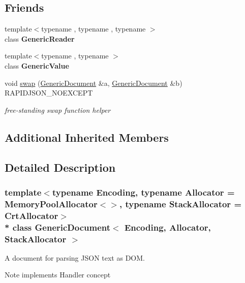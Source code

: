 \subsection*{Friends}
\begin{DoxyCompactItemize}
\item 
{\footnotesize template$<$typename , typename , typename $>$ }\\class {\bfseries Generic\+Reader}\hypertarget{class_generic_document_a22b985b0f7f78ef254a566655ee0550f}{}\label{class_generic_document_a22b985b0f7f78ef254a566655ee0550f}

\item 
{\footnotesize template$<$typename , typename $>$ }\\class {\bfseries Generic\+Value}\hypertarget{class_generic_document_a899449e1a645b5e377af059fb61113d8}{}\label{class_generic_document_a899449e1a645b5e377af059fb61113d8}

\item 
void \hyperlink{class_generic_document_a0d63efcc43758ac3aed77e868233369d}{swap} (\hyperlink{class_generic_document}{Generic\+Document} \&a, \hyperlink{class_generic_document}{Generic\+Document} \&b) R\+A\+P\+I\+D\+J\+S\+O\+N\+\_\+\+N\+O\+E\+X\+C\+E\+PT
\begin{DoxyCompactList}\small\item\em free-\/standing swap function helper \end{DoxyCompactList}\end{DoxyCompactItemize}
\subsection*{Additional Inherited Members}


\subsection{Detailed Description}
\subsubsection*{template$<$typename Encoding, typename Allocator = Memory\+Pool\+Allocator$<$$>$, typename Stack\+Allocator = Crt\+Allocator$>$\\*
class Generic\+Document$<$ Encoding, Allocator, Stack\+Allocator $>$}

A document for parsing J\+S\+ON text as D\+OM. 

\begin{DoxyNote}{Note}
implements Handler concept 
\end{DoxyNote}

